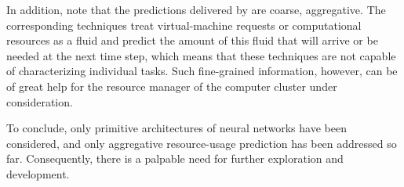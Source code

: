 In addition, note that the predictions delivered by \cite{dabbagh2015,
ismaeel2015, cao2014} are coarse, aggregative. The corresponding techniques
treat virtual-machine requests or computational resources as a fluid and predict
the amount of this fluid that will arrive or be needed at the next time step,
which means that these techniques are not capable of characterizing individual
tasks. Such fine-grained information, however, can be of great help for the
resource manager of the computer cluster under consideration.

To conclude, only primitive architectures of neural networks have been
considered, and only aggregative resource-usage prediction has been addressed so
far. Consequently, there is a palpable need for further exploration and
development.
